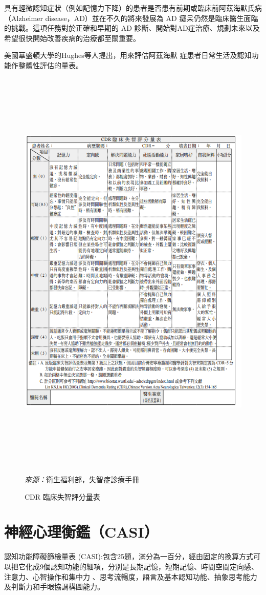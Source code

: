 具有輕微認知症狀（例如記憶力下降）的患者是否患有前期或臨床前阿茲海默氏病（Alzheimer disease，AD）並在不久的將來發展為 AD 癡呆仍然是臨床醫生面臨的挑戰。這項任務對於正確和早期的 AD 診斷、開始對AD症治療、規劃未來以及希望很快開始改善疾病的治療都至關重要。

美國華盛頓大學的Hughes等人提出，用來評估阿茲海默 症患者日常生活及認知功能作整體性評估的量表。

\begin{figure}[H]
	\centerline{\includegraphics[height=20cm]{pic/CDR.PNG}}
	\caption{CDR 臨床失智評分量表}
	\begin{minipage}{.7\linewidth}
		\centering
		\footnotesize
		\emph{來源：}衛生福利部，失智症診療手冊
	\end{minipage}
	
	\label{fig:CDR}
\end{figure}




\section{神經心理衡鑑（CASI）}
認知功能障礙篩檢量表 (CASI):包含25題，滿分為一百分，經由固定的換算方式可以把它化成9個認知功能的細項，分別是長期記憶，短期記憶、時間空間定向感、注意力、心智操作和集中力 、思考流暢度，語言及基本認知功能、抽象思考能力及判斷力和手眼協調構圖能力。



%

%

